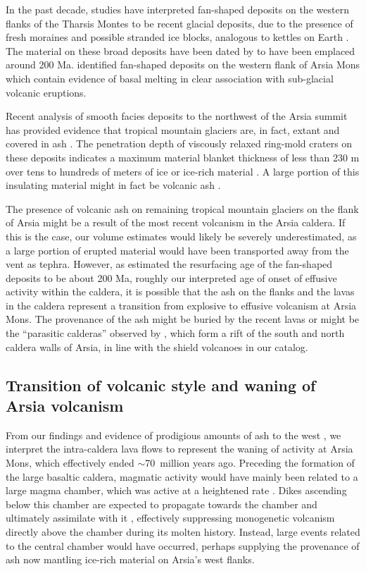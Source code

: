 \documentclass[12pt,letter]{article}
\begin{document}
In the past decade, studies have interpreted fan-shaped deposits on the western flanks of the Tharsis Montes to be recent glacial deposits, due to the presence of fresh moraines and possible stranded ice blocks, analogous to kettles on Earth \citep{shean2007recent,kadish2014middle,scanlon2015remnant}. The material on these broad deposits have been dated by \citet{kadish2014middle} to have been emplaced around 200 Ma. \citet{scanlon2015volcanism} identified fan-shaped deposits on the western flank of Arsia Mons which contain evidence of basal melting in clear association with sub-glacial volcanic eruptions. 

Recent analysis of smooth facies deposits to the northwest of the Arsia summit has provided evidence that tropical mountain glaciers are, in fact, extant and covered in ash \citep{scanlon2015remnant}. The penetration depth of viscously relaxed ring-mold craters on these deposits indicates a maximum material blanket thickness of less than 230 m over tens to hundreds of meters of ice or ice-rich material \citep{head2014preservation}. A large portion of this insulating material might in fact be volcanic ash \citep{wilson1994mars,mouginis2002prodigious}.

The presence of volcanic ash on remaining tropical mountain glaciers on the flank of Arsia might be a result of the most recent volcanism in the Arsia caldera. If this is the case, our volume estimates would likely be severely underestimated, as a large portion of erupted material would have been transported away from the vent as tephra. However, as \citet{kadish2014middle} estimated the resurfacing age of the fan-shaped deposits to be about 200 Ma, roughly our interpreted age of onset of effusive activity within the caldera, it is possible that the ash on the flanks and the lavas in the caldera represent a transition from explosive to effusive volcanism at Arsia Mons. The provenance of the ash might be buried by the recent lavas or might be the ``parasitic calderas'' observed by \citet{crumpler1996calderas}, which form a rift of the south and north caldera walls of Arsia, in line with the shield volcanoes in our catalog.

\subsection{Transition of volcanic style and waning of Arsia volcanism}
From our findings and evidence of prodigious amounts of ash to the west \citep{mouginis2002prodigious}, we interpret the intra-caldera lava flows to represent the waning of activity at Arsia Mons, which effectively ended $\sim$70~million years ago. Preceding the formation of the large basaltic caldera, magmatic activity would have mainly been related to a large magma chamber, which was active at a heightened rate \citep{wilson2001evidence}. Dikes ascending below this chamber are expected to propagate towards the chamber and ultimately assimilate with it \citep{karlstrom2009organization}, effectively suppressing monogenetic volcanism directly above the chamber during its molten history. Instead, large events related to the central chamber would have occurred, perhaps supplying the provenance of ash now mantling ice-rich material on Arsia's west flanks.
\end{document}
